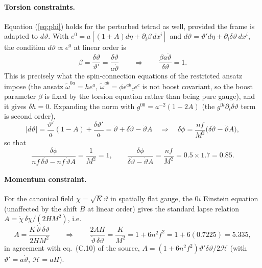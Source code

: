 \documentclass[11pt]{article}
\begin{document}
\paragraph{Torsion constraints.} Equation (\ref{eq:phi}) holds for the perturbed tetrad as well, provided the frame is adapted to $d\vartheta$. With $e^0=a[(1+A)d\eta+\partial_i\beta\,dx^i]$ and $d\vartheta=\vartheta'd\eta+\partial_i\delta\vartheta\,dx^i$, the condition $d\vartheta\propto e^0$ at linear order is
\begin{equation}
\beta=\frac{\delta\vartheta}{\vartheta'}=\frac{\delta\vartheta}{a\dot\vartheta}\qquad\Longrightarrow\qquad \frac{\beta a\dot\vartheta}{\delta\vartheta}=1 .
\end{equation}
This is precisely what the spin-connection equations of the restricted ansatz impose (the ansatz $\tilde\omega^{0a}=he^a$, $\tilde\omega^{ab}=\phi\epsilon^{ab}{}_ce^c$ is not boost covariant, so the boost parameter $\beta$ is fixed by the torsion equation rather than being pure gauge), and it gives $\delta h=0$. Expanding the norm with $g^{00}=a^{-2}(1-2A)$ (the $g^{0i}\partial_i\delta\vartheta$ term is second order),
\begin{equation}
|d\vartheta|=\frac{\vartheta'}{a}(1-A)+\frac{\delta\vartheta'}{a}=\dot\vartheta+\delta\dot\vartheta-\dot\vartheta A
\quad\Longrightarrow\quad
\delta\phi=\frac{nf}{M^2}\big(\delta\dot\vartheta-\dot\vartheta A\big),
\end{equation}
so that
\begin{equation}
\frac{\delta\phi}{nf\,\delta\dot\vartheta-nf\,\dot\vartheta A}=\frac{1}{M^2}=1,\qquad
\frac{\delta\phi}{\delta\dot\vartheta-\dot\vartheta A}=\frac{nf}{M^2}=0.5\times1.7=0.85 .
\end{equation}
\paragraph{Momentum constraint.} For the canonical field $\chi=\sqrt K\vartheta$ in spatially flat gauge, the $0i$ Einstein equation (unaffected by the shift $B$ at linear order) gives the standard lapse relation $A=\dot\chi\,\delta\chi/(2HM^2)$, i.e.
\begin{equation}
A=\frac{K\,\dot\vartheta\,\delta\vartheta}{2HM^2}\qquad\Longrightarrow\qquad
\frac{2AH}{\dot\vartheta\,\delta\vartheta}=\frac{K}{M^2}=1+6n^2f^2=1+6(0.7225)=5.335 ,
\end{equation}
in agreement with eq.\ (C.10) of the source, $A=(1+6n^2f^2)\vartheta'\delta\vartheta/2\mathcal H$ (with $\vartheta'=a\dot\vartheta$, $\mathcal H=aH$).
\end{document}
